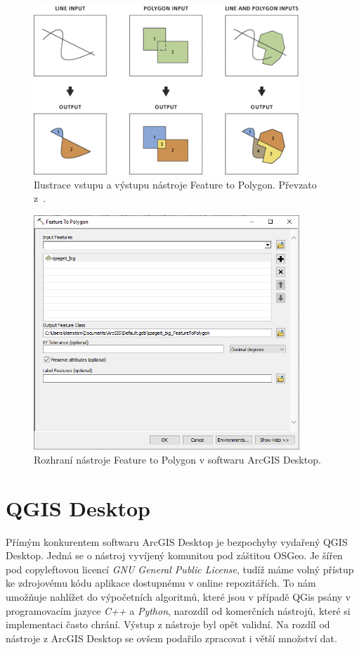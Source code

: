 \begin{figure}[h]
  \centering
  \includegraphics[width=10cm]{./pictures/5_1/feature_to_polygon.png}
  \caption{Ilustrace vstupu a výstupu nástroje Feature to Polygon. Převzato z~\cite{arcgis}.}
  \label{fig:feature_to_polygon}
\end{figure}

\begin{figure}[h]
  \centering
  \includegraphics[width=10cm]{./pictures/5_1/feature_to_polygon-1.png}
  \caption{Rozhraní nástroje Feature to Polygon v softwaru ArcGIS Desktop.}
  \label{fig:feature_to_polygon-1}
\end{figure}


\section{QGIS Desktop}
Přímým konkurentem softwaru ArcGIS Desktop je bezpochyby vydařený QGIS
Desktop. Jedná se o nástroj vyvíjený komunitou pod záštitou OSGeo. Je
šířen pod copyleftovou licencí \textit{GNU General Public License},
tudíž máme volný přístup ke zdrojovému kódu aplikace dostupnému v
online repozitářích. To nám umožňuje nahlížet do výpočetních
algoritmů, které jsou v případě QGis psány v programovacím jazyce
\textit{C++} a \textit{Python}, narozdíl od komerčních nástrojů, které
si implementaci často chrání. Výstup z nástroje byl opět validní. Na
rozdíl od nástroje z ArcGIS Desktop se ovšem podařilo zpracovat i
větší množství dat.

